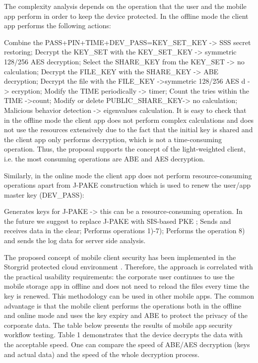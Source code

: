 \documentclass[twocolumn]{svjour3}          %
\begin{document}
The complexity analysis depends on the operation that the user and the mobile app perform in order to keep the device protected. In the offline mode the client app performs the following actions:

Combine the PASS+PIN+TIME+DEV\_PASS=KEY\_SET\_KEY   ->  SSS secret restoring;
Decrypt the KEY\_SET with the KEY\_SET\_KEY -> symmetric 128/256 AES decryption;
Select the SHARE\_KEY from the KEY\_SET -> no calculation;
Decrypt the FILE\_KEY with the SHARE\_KEY  -> ABE decryption;
Decrypt the file with the FILE\_KEY ->symmetric 128/256 AES d -> ecryption;
Modify the TIME periodically -> timer;
Count the tries within the TIME ->count;
Modify or delete PUBLIC\_SHARE\_KEY-> no calculation;
Malicious behavior detection -> eigenvalues calculation.
It is easy to check that in the offline mode the client app does not perform complex calculations and does not use the resources extensively due to the fact that the initial key is shared and the client app only performs decryption, which is not a time-consuming operation. Thus, the proposal supports the concept of the light-weighted client, i.e. the most consuming operations are ABE and AES decryption. 

Similarly, in the online mode the client app does not perform resource-consuming operations apart from J-PAKE construction which is used to renew the user/app master key (DEV\_PASS):

Generates keys for J-PAKE -> this can be a resource-consuming operation. In the future we suggest to replace J-PAKE with SIS-based PKE \cite{bogos2013primeless,bellovin1992encrypted};
Sends and receives data in the clear;
Performs operations 1)-7);
Performs the operation 8) and sends the log data for server side analysis.

The proposed concept of mobile client security has been implemented in the Storgrid protected cloud environment \cite{storgrid2016}. Therefore, the approach is correlated with the practical usability requirements:  the corporate user continues to use the mobile storage app in offline and does not need to reload the files every time the key is renewed. This methodology can be used in other mobile apps. The common advantage is that the mobile client performs the operations both in the offline and online mode and uses the key expiry and ABE to protect the privacy of the corporate data. The table below presents the results of mobile app security workflow testing. Table 1 demonstrates that the device decrypts the data with the acceptable speed. One can compare the speed of ABE/AES decryption (keys and actual data) and the speed of the whole decryption process.
\end{document}
